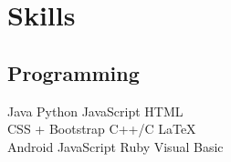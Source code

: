 \documentclass[]{deedy-resume-openfont}
\begin{document}
\begin{minipage}[t]{0.33\textwidth}

\section{Skills}
\subsection{Programming}
Java \textbullet{}   Python \textbullet{} JavaScript \textbullet{} HTML \\
CSS + Bootstrap \textbullet{} C++/C \textbullet{} \LaTeX\ \\ 
Android \textbullet{} JavaScript \textbullet{} Ruby \textbullet{} Visual Basic
\sectionsep

%
%

\end{minipage} 
\hfill
\end{document}
